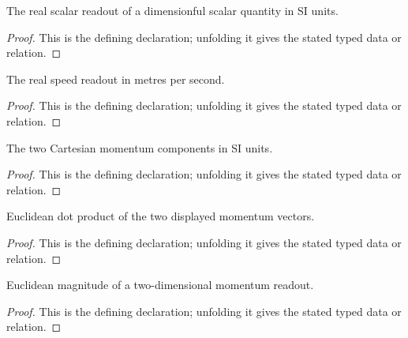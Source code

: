 \begin{definition}[scalarSI]
  \label{decl:physics:IPhO_2026_1_C_1:scalarSI}
  The real scalar readout of a dimensionful scalar quantity in SI units.
\end{definition}
\begin{proof}
  This is the defining declaration; unfolding it gives the stated typed data or relation.
\end{proof}

\begin{definition}[speedSI]
  \label{decl:physics:IPhO_2026_1_C_1:speedSI}
  The real speed readout in metres per second.
\end{definition}
\begin{proof}
  This is the defining declaration; unfolding it gives the stated typed data or relation.
\end{proof}

\begin{definition}[momentumSI]
  \label{decl:physics:IPhO_2026_1_C_1:momentumSI}
  The two Cartesian momentum components in SI units.
\end{definition}
\begin{proof}
  This is the defining declaration; unfolding it gives the stated typed data or relation.
\end{proof}

\begin{definition}[dot2]
  \label{decl:physics:IPhO_2026_1_C_1:dot2}
  Euclidean dot product of the two displayed momentum vectors.
\end{definition}
\begin{proof}
  This is the defining declaration; unfolding it gives the stated typed data or relation.
\end{proof}

\begin{definition}[magnitude2]
  \label{decl:physics:IPhO_2026_1_C_1:magnitude2}
  Euclidean magnitude of a two-dimensional momentum readout.
\end{definition}
\begin{proof}
  This is the defining declaration; unfolding it gives the stated typed data or relation.
\end{proof}

